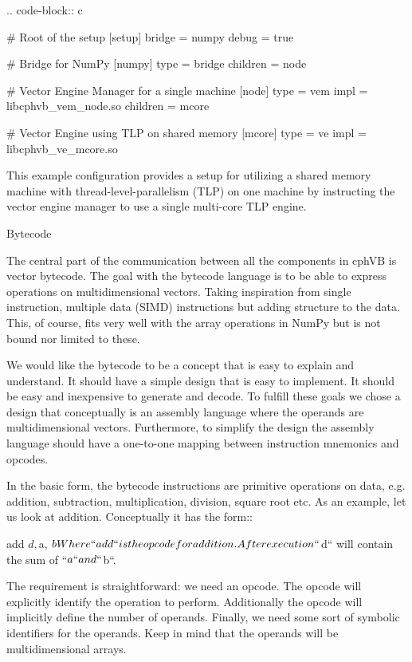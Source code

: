 .. code-block:: c

   # Root of the setup
   [setup]
   bridge = numpy
   debug = true

   # Bridge for NumPy
   [numpy]
   type = bridge
   children = node

   # Vector Engine Manager for a single machine
   [node]
   type = vem
   impl = libcphvb_vem_node.so
   children = mcore

   # Vector Engine using TLP on shared memory
   [mcore]
   type = ve
   impl = libcphvb_ve_mcore.so


This example configuration provides a setup for utilizing a shared memory machine with thread-level-parallelism (TLP) on one machine by instructing the vector engine manager to use a single multi-core TLP engine.

Bytecode
~~~~~~~~~

The central part of the communication between all the components in cphVB is vector bytecode. The goal with the bytecode language is to be able to express operations on multidimensional vectors. Taking inspiration from single instruction, multiple data (SIMD) instructions but adding structure to the data. This, of course, fits very well with the array operations in NumPy but is not bound nor limited to these.

We would like the bytecode to be a concept that is easy to explain and understand. It should have a simple design that is easy to implement. It should be easy and inexpensive to generate and decode. To fulfill these goals we chose a design that conceptually is an assembly language where the operands are multidimensional vectors. Furthermore, to simplify the design the assembly language should have a one-to-one mapping between instruction mnemonics and opcodes.

In the basic form, the bytecode instructions are primitive operations on data, e.g. addition, subtraction, multiplication, division, square root etc. As an example, let us look at addition. Conceptually it has the form::

    add $d, $a, $b

Where ``add`` is the opcode for addition. After execution ``$d`` will contain the sum of ``$a`` and ``$b``.

The requirement is straightforward: we need an opcode. The opcode will explicitly identify the operation to perform. Additionally the opcode will implicitly define the number of operands. Finally, we need some sort of symbolic identifiers for the operands. Keep in mind that the operands will be multidimensional arrays.

